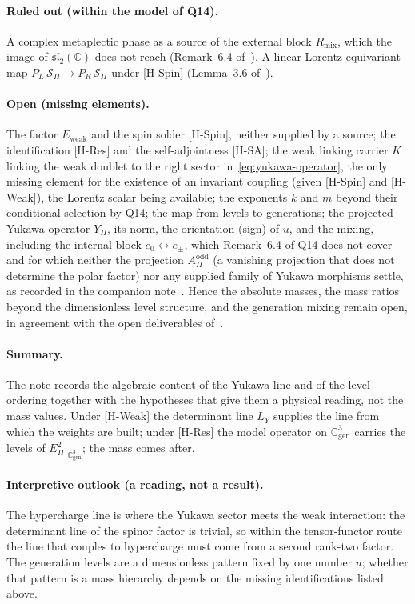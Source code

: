 \documentclass[11pt]{article}
\theoremstyle{definition}
\theoremstyle{remark}
\newcommand{\AOdd}{A_{\Pi}^{\mathrm{odd}}}
\newcommand{\Rmix}{R_{\mathrm{mix}}}
\newcommand{\Cgen}{\mathbb{C}^{3}_{\mathrm{gen}}}
\newcommand{\Epi}{E_{\Pi}}
\newcommand{\Sbundle}{\mathcal{S}_{\Pi}}
\newcommand{\Ew}{E_{\mathrm{weak}}}
\newcommand{\LY}{L_{Y}}
\begin{document}
    \paragraph{Ruled out (within the model of Q14).}
      A complex metaplectic phase as a source of the external block $\Rmix$, which the image of
      $\mathfrak{sl}_{2}(\mathbb{C})$ does not reach (Remark~6.4 of~\cite{Beau2026q14}).
      A linear Lorentz-equivariant map $P_{L}\,\Sbundle \to P_{R}\,\Sbundle$ under [H-Spin]
      (Lemma~3.6 of~\cite{Beau2026q14}).

    \paragraph{Open (missing elements).}
      The factor $\Ew$ and the spin solder [H-Spin], neither supplied by a source; the identification [H-Res] and the self-adjointness [H-SA]; the
      weak linking carrier $K$ linking the weak doublet to the right sector in~\eqref{eq:yukawa-operator}, the only
      missing element for the existence of an invariant coupling (given [H-Spin] and [H-Weak]), the Lorentz scalar
      being available; the exponents $k$ and $m$ beyond their conditional selection by Q14; the map from levels to
      generations; the projected Yukawa operator $Y_{\Pi}$, its norm, the orientation (sign) of $u$, and the mixing,
      including the internal block $e_{0} \leftrightarrow e_{\pm}$, which Remark~6.4 of Q14 does not cover and for
      which neither the projection $\AOdd$ (a vanishing projection that does not determine the polar factor) nor any
      supplied family of Yukawa morphisms settle, as recorded in the companion note~\cite{Beau2026pyo}.
      Hence the absolute masses, the mass ratios beyond the dimensionless level structure, and the generation mixing
      remain open, in agreement with the open deliverables of~\cite{Beau2026fmnote}.

    \paragraph{Summary.}
      The note records the algebraic content of the Yukawa line and of the level ordering together with the
      hypotheses that give them a physical reading, not the mass values.
      Under [H-Weak] the determinant line $\LY$ supplies the line from which the weights are built; under [H-Res] the
      model operator on $\Cgen$ carries the levels of $\Epi^{2}|_{\Cgen}$; the mass comes after.

    \paragraph{Interpretive outlook (a reading, not a result).}
      The hypercharge line is where the Yukawa sector meets the weak interaction: the determinant line of the spinor
      factor is trivial, so within the tensor-functor route the line that couples to hypercharge must come from a second
      rank-two factor.
      The generation levels are a dimensionless pattern fixed by one number $u$; whether that pattern is a mass
      hierarchy depends on the missing identifications listed above.
\end{document}
